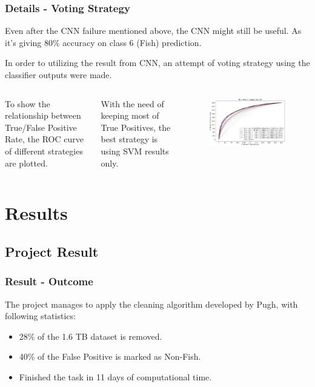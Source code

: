 \documentclass{beamer}[fullspacing]
\begin{document}
\begin{frame}
\frametitle{Details - Voting Strategy}

Even after the CNN failure mentioned above, the CNN might still be useful. As it's giving 80\% accuracy on class 6 (Fish) prediction. 

\vspace{5pt}
In order to utilizing the result from CNN, an attempt of voting strategy using the classifier outputs were made.

\vspace{8pt}
\begin{columns}
To show the relationship between True/False Positive Rate, the ROC curve of different strategies are plotted.

\vspace{5pt}
With the need of keeping most of True Positives, the best strategy is using SVM results only.
\begin{figure}
\includegraphics[scale=0.2]{image/roccurve.png}
\end{figure}
\end{columns}
\end{frame}



\section{Results}
\subsection{Project Result}
\begin{frame}
\frametitle{Result - Outcome}

The project manages to apply the cleaning algorithm developed by Pugh, with following statistics:
\begin{itemize}
\item
28\% of the 1.6 TB dataset is removed.
\item
40\% of the False Positive is marked as Non-Fish.
\item
Finished the task in 11 days of computational time.
\end{itemize}
\end{frame}
\end{document}
